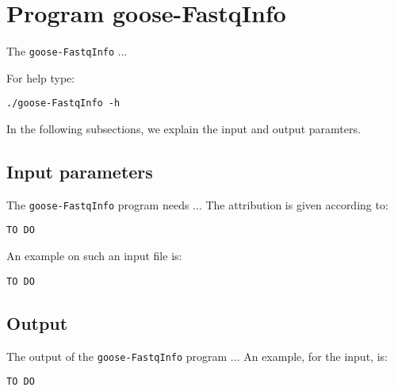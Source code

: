 \section{Program goose-FastqInfo}
The \texttt{goose-FastqInfo} ...

For help type:
\begin{lstlisting}
./goose-FastqInfo -h
\end{lstlisting}
In the following subsections, we explain the input and output paramters.

\subsection*{Input parameters}

The \texttt{goose-FastqInfo} program needs ...
The attribution is given according to:
\begin{lstlisting}
TO DO
\end{lstlisting}

An example on such an input file is:
\begin{lstlisting}
TO DO
\end{lstlisting}

\subsection*{Output}
The output of the \texttt{goose-FastqInfo} program ...
An example, for the input, is:
\begin{lstlisting}
TO DO
\end{lstlisting}
